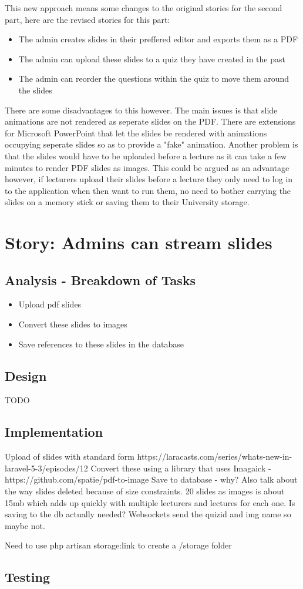 \documentclass{article}
\begin{document}
This new approach means some changes to the original stories for the second part, here are the revised stories for this part:
\begin{itemize}
	\item The admin creates slides in their preffered editor and exports them as a PDF
	\item The admin can upload these slides to a quiz they have created in the past
	\item The admin can reorder the questions within the quiz to move them around the slides
\end{itemize}

There are some disadvantages to this however. The main issues is that slide animations are not rendered as seperate slides on the PDF. There are extensions for Microsoft PowerPoint that let the slides be rendered with animations occupying seperate slides so as to provide a "fake" animation. Another problem is that the slides would have to be uploaded before a lecture as it can take a few minutes to render PDF slides as images. This could be argued as an advantage however, if lecturers upload their slides before a lecture they only need to log in to the application when then want to run them, no need to bother carrying the slides on a memory stick or saving them to their University storage.
\newpage

\section{Story: Admins can stream slides}
\subsection{Analysis - Breakdown of Tasks}
\begin{itemize}
	\item Upload pdf slides
	\item Convert these slides to images
	\item Save references to these slides in the database
\end{itemize}
\subsection{Design}
TODO
\subsection{Implementation}
Upload of slides with standard form https://laracasts.com/series/whats-new-in-laravel-5-3/episodes/12
Convert these using a library that uses Imagaick - https://github.com/spatie/pdf-to-image
Save to database - why? Also talk about the way slides deleted because of size constraints. 20 slides as images is about 15mb which adds up quickly with multiple lecturers and lectures for each one. Is saving to the db actually needed? Websockets send the quizid and img name so maybe not.

Need to use php artisan storage:link to create a /storage folder
\subsection{Testing}
\newpage

%
%
\end{document}
